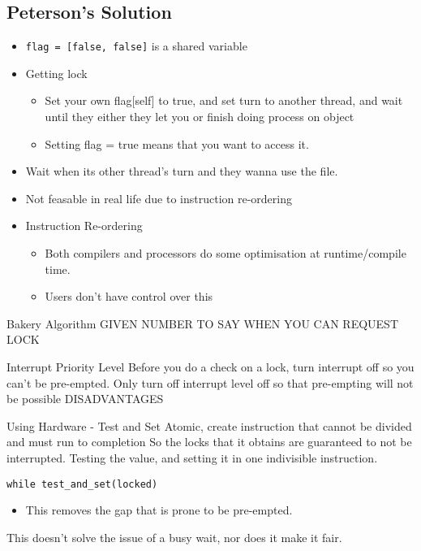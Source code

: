 \documentclass{article}
\begin{document}
	\subsection{Peterson's Solution}
		\begin{itemize}
			\item \texttt{flag = [false, false]} is a shared variable
			\item Getting lock
			\begin{itemize}
				\item Set your own flag[self] to true, and set turn to another thread, and wait until they either they let you or finish doing process on object
				\item Setting flag = true means that you want to access it. 
			\end{itemize}

			\item Wait when its other thread's turn and they wanna use the file.
			\item Not feasable in real life due to instruction re-ordering

			\item Instruction Re-ordering
			\begin{itemize}
				\item Both compilers and processors do some optimisation at runtime/compile time. 
				\item Users don't have control over this
			\end{itemize}
		\end{itemize}

	Bakery Algorithm
		GIVEN NUMBER TO SAY WHEN YOU CAN REQUEST LOCK

	Interrupt Priority Level
		Before you do a check on a lock, turn interrupt off so you can't be pre-empted.
		Only turn off interrupt level off so that pre-empting will not be possible
		DISADVANTAGES

	Using Hardware - Test and Set
		Atomic, create instruction that cannot be divided and must run to completion
		So the locks that it obtains are guaranteed to not be interrupted.
		Testing the value, and setting it in one indivisible instruction.

		\texttt{while test\_and\_set(locked)}
		\begin{itemize}
			\item This removes the gap that is prone to be pre-empted.

		\end{itemize}

		This doesn't solve the issue of a busy wait, nor does it make it fair.
\end{document}
